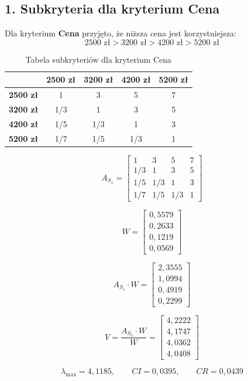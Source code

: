 \documentclass[12pt,a4paper]{article}
\begin{document}
\subsection*{1. Subkryteria dla kryterium Cena}

Dla kryterium \textbf{Cena} przyjęto, że niższa cena jest korzystniejsza:
\[
2500\text{ zł} > 3200\text{ zł} > 4200\text{ zł} > 5200\text{ zł}
\]

\begin{table}[H]
\centering
\caption{Tabela subkryteriów dla kryterium Cena}
\begin{tabular}{lcccc}
\toprule
 & \textbf{2500 zł} & \textbf{3200 zł} & \textbf{4200 zł} & \textbf{5200 zł} \\
\midrule
\textbf{2500 zł} & 1 & 3 & 5 & 7 \\
\textbf{3200 zł} & 1/3 & 1 & 3 & 5 \\
\textbf{4200 zł} & 1/5 & 1/3 & 1 & 3 \\
\textbf{5200 zł} & 1/7 & 1/5 & 1/3 & 1 \\
\bottomrule
\end{tabular}
\end{table}

\[
A_{S_1}=
\begin{bmatrix}
1 & 3 & 5 & 7 \\
1/3 & 1 & 3 & 5 \\
1/5 & 1/3 & 1 & 3 \\
1/7 & 1/5 & 1/3 & 1
\end{bmatrix}
\]

\[
W=
\begin{bmatrix}
0{,}5579\\
0{,}2633\\
0{,}1219\\
0{,}0569
\end{bmatrix}
\]

\[
A_{S_1}\cdot W=
\begin{bmatrix}
2{,}3555\\
1{,}0994\\
0{,}4919\\
0{,}2299
\end{bmatrix}
\]

\[
V=
\frac{A_{S_1}\cdot W}{W}
=
\begin{bmatrix}
4{,}2222\\
4{,}1747\\
4{,}0362\\
4{,}0408
\end{bmatrix}
\]

\[
\lambda_{\max}=4{,}1185,\qquad
CI=0{,}0395,\qquad
CR=0{,}0439
\]
\end{document}
